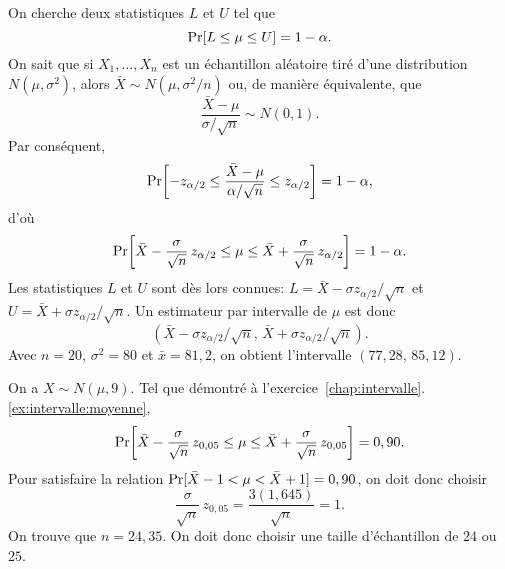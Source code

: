 \begin{solution}{5.2}
    On cherche deux statistiques $L$ et $U$ tel que
    \begin{equation*}
      \mathrm{Pr} [ L \leq \mu \leq U ] = 1 - \alpha.
    \end{equation*}
    On sait que si $X_1, \dots, X_n$ est un échantillon aléatoire tiré
    d'une distribution $N(\mu, \sigma^2)$, alors $\bar{X} \sim N(\mu,
    \sigma^2/n)$ ou, de manière équivalente, que
    \begin{displaymath}
      \frac{\bar{X} - \mu}{\sigma / \sqrt{n}} \sim N(0, 1).
    \end{displaymath}
    Par conséquent,
    \begin{equation*}
      \mathrm{Pr}\! \left[ -z_{\alpha/2} \leq \frac{\bar{X} - \mu}{\alpha/\sqrt{n}} \leq
        z_{\alpha/2} \right] = 1 - \alpha,
    \end{equation*}
    d'où
    \begin{equation*}
      \mathrm{Pr}\! \left[ \bar{X} - \frac{\sigma}{\sqrt{n}}\, z_{\alpha/2} \leq \mu
        \leq \bar{X} + \frac{\sigma}{\sqrt{n}}\, z_{\alpha/2} \right] = 1 - \alpha.
    \end{equation*}
    Les statistiques $L$ et $U$ sont dès lors connues: $L = \bar{X} -
    \sigma z_{\alpha/2}/\sqrt{n}$ et $U = \bar{X} + \sigma
    z_{\alpha/2}/\sqrt{n}$. Un estimateur par intervalle de $\mu$ est
    donc
    \begin{equation*}
      (\bar{X} - \sigma z_{\alpha/2}/\sqrt{n}, \,
      \bar{X} + \sigma z_{\alpha/2}/\sqrt{n}).
    \end{equation*}
    Avec $n = 20$, $\sigma^2 = 80$ et $\bar{x} = 81,2$, on obtient
    l'intervalle $(77,28, \, 85,12)$.
  
\end{solution}
\begin{solution}{5.3}
    On a $X \sim N(\mu, 9)$. Tel que démontré à
    l'exercice~\ref{chap:intervalle}.\ref{ex:intervalle:moyenne},
    \begin{equation*}
      \mathrm{Pr}\! \left[ \bar{X} - \frac{\sigma}{\sqrt{n}}\, z_{0,05} \leq \mu
        \leq \bar{X} + \frac{\sigma}{\sqrt{n}}\, z_{0,05} \right] = 0,90.
    \end{equation*}
    Pour satisfaire la relation $\mathrm{Pr} [ \bar{X} - 1 < \mu < \bar{X} +
      1 ] = 0,90$, on doit donc choisir
    \begin{equation*}
      \frac{\sigma}{\sqrt{n}}\, z_{0,05} =
      \frac{3 (1,645)}{\sqrt{n}} = 1.
    \end{equation*}
    On trouve que $n = 24,35$. On doit donc choisir une taille
    d'échantillon de $24$ ou $25$.
  
\end{solution}
